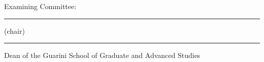 {\begin{titlepage}
\begin{minipage}{0.45\textwidth}
			\raggedright
			Examining Committee:\par
			\vspace{0.75\baselineskip}
			\begingroup
			\renewcommand{\thesis@memberline}[2]{%
				\vspace{1.5\baselineskip}%
				\rule{\linewidth}{0.4pt}\par
				##1\par
			}%
			\vspace{1.5\baselineskip}%
			\rule{\linewidth}{0.4pt}\par
			(chair) \thesis@advisor\par
			\thesis@committee
			\endgroup
		\end{minipage}%
		\par
		\vspace{2\baselineskip}
		\noindent
		\begin{minipage}{0.75\textwidth}
			\raggedright
			\rule{0.45\textwidth}{0.4pt}\par
			\thesis@dc@dean\par
			Dean of the Guarini School of Graduate and Advanced Studies\par
		\end{minipage}%
		\par

	\end{titlepage}%
}

%
\thesisnoapprovalpage
